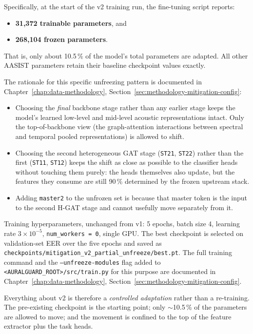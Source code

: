 Specifically, at the start of the v2 training run, the fine-tuning
script reports:

\begin{itemize}
    \item \textbf{31,372 trainable parameters}, and
    \item \textbf{268,104 frozen parameters}.
\end{itemize}

That is, only about 10.5\,\% of the model's total parameters are
adapted. All other AASIST parameters retain their baseline
checkpoint values exactly.

The rationale for this specific unfreezing pattern is documented
in Chapter~\ref{chap:data-methodology}, Section~\ref{sec:methodology-mitigation-config}:

\begin{itemize}
    \item Choosing the \emph{final} backbone stage rather than any earlier
        stage keeps the model's learned low-level and mid-level
        acoustic representations intact. Only the top-of-backbone
        view (the graph-attention interactions between spectral and
        temporal pooled representations) is allowed to shift.
    \item Choosing the second heterogeneous GAT stage (\texttt{ST21}, \texttt{ST22})
        rather than the first (\texttt{ST11}, \texttt{ST12}) keeps the shift as close
        as possible to the classifier heads without touching them
        purely: the heads themselves also update, but the features
        they consume are still 90\,\% determined by the frozen upstream
        stack.
    \item Adding \texttt{master2} to the unfrozen set is because that master
        token is the input to the second H-GAT stage and cannot
        usefully move separately from it.
\end{itemize}

Training hyperparameters, unchanged from v1: 5 epochs, batch
size 4, learning rate $3 \times 10^{-5}$, \texttt{num\_workers = 0}, single GPU.
The best checkpoint is selected on validation-set EER over the
five epochs and saved as \texttt{checkpoints/mitigation\_v2\_partial\_unfreeze/best.pt}.
The full training command and the
\texttt{--unfreeze-modules} flag added to \texttt{<AURALGUARD\_ROOT>/src/train.py}
for this purpose are documented in Chapter~\ref{chap:data-methodology},
Section~\ref{sec:methodology-mitigation-config}.

Everything about v2 is therefore a \emph{controlled adaptation}
rather than a re-training. The pre-existing checkpoint is the
starting point; only $\sim$10.5\,\% of the parameters are allowed
to move; and the movement is confined to the top of the feature
extractor plus the task heads.


